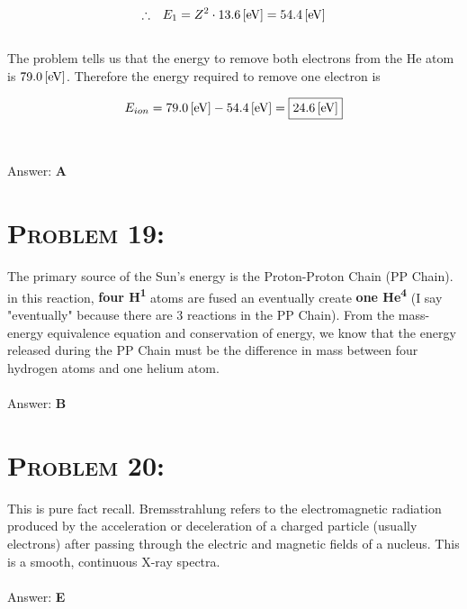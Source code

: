 \documentclass{article}
\begin{document}
\begin{gather}
\therefore \hspace{.1in} E_{1} = Z^{2} \cdot \unit[13.6]{[eV]} = \unit[54.4]{[eV]}\nonumber
\end{gather}
\\
The problem tells us that the energy to remove both electrons from the He atom is $\unit[79.0]{[eV]}$. Therefore the energy required to remove one electron is

\begin{gather}
E_{ion} =  \unit[79.0]{[eV]} - \unit[54.4]{[eV]} = \boxed{\unit[24.6]{[eV]}}\nonumber
\end{gather}
\\\\
Answer: \textbf{\textcolor{ProcessBlue}A}\\


\section{\textsc{Problem 19:}} The primary source of the Sun's energy is the Proton-Proton Chain (PP Chain). in this reaction, \textbf{four H\textsuperscript{1}} atoms are fused an eventually create \textbf{one He\textsuperscript{4}} (I say "eventually" because there are 3 reactions in the PP Chain). From the mass-energy equivalence equation and conservation of energy, we know that the energy released during the PP Chain must be the difference in mass between four hydrogen atoms and one helium atom.
\\\\
Answer: \textbf{\textcolor{ProcessBlue}B}\\


\section{\textsc{Problem 20:}} This is pure fact recall. Bremsstrahlung refers to the electromagnetic radiation produced by the acceleration or deceleration of a charged particle (usually electrons) after passing through the electric and magnetic fields of a nucleus. This is a smooth, continuous X-ray spectra.
\\\\
Answer: \textbf{\textcolor{ProcessBlue}E}\\
\end{document}
